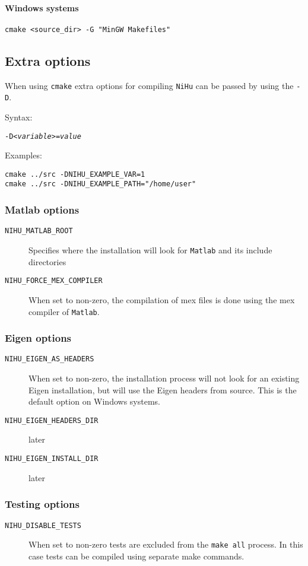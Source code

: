 \documentclass[a4paper,10pt]{article}
\begin{document}
\paragraph{Windows systems}

\begin{verbatim}
cmake <source_dir> -G "MinGW Makefiles"
\end{verbatim}


\subsection{Extra options}

When using \texttt{cmake} extra options for compiling \texttt{NiHu} can be passed by using the \texttt{-D}.

Syntax:

\texttt{-D\itshape{<variable>}=\itshape{value}}

Examples:

\begin{verbatim}
cmake ../src -DNIHU_EXAMPLE_VAR=1
cmake ../src -DNIHU_EXAMPLE_PATH="/home/user"
\end{verbatim}

\subsubsection{Matlab options}

\begin{description}
	\item [\texttt{NIHU\_MATLAB\_ROOT}] Specifies where the installation will look for \texttt{Matlab} and its include directories
	\item [\texttt{NIHU\_FORCE\_MEX\_COMPILER}] When set to non-zero, the compilation of mex files is done using the mex compiler of \texttt{Matlab}.
\end{description}

\subsubsection{Eigen options}

\begin{description}
	\item [\texttt{NIHU\_EIGEN\_AS\_HEADERS}] When set to non-zero, the installation process will not look for an existing Eigen installation, but will use the Eigen headers from source. This is the default option on Windows systems.

	\item [\texttt{NIHU\_EIGEN\_HEADERS\_DIR}] later
	\item [\texttt{NIHU\_EIGEN\_INSTALL\_DIR}] later
\end{description}

\subsubsection{Testing options}

\begin{description}
	\item [\texttt{NIHU\_DISABLE\_TESTS}] When set to non-zero tests are excluded from the \texttt{make all} process. In this case tests can be compiled using separate make commands.
\end{description}
\end{document}
